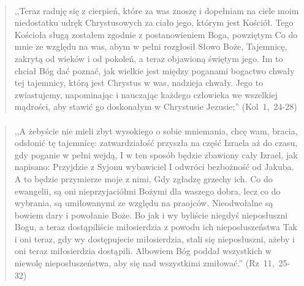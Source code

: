 \documentclass[10pt,a4paper,oneside]{article}
\begin{document}
\paragraph{}
\begin{quote}
,,Teraz raduję się z cierpień, które za was znoszę i dopełniam na ciele moim niedostatku udręk Chrystusowych za ciało jego, którym jest Kościół. Tego Kościoła sługą zostałem zgodnie z postanowieniem Boga, powziętym Co do mnie ze względu na was, abym w pełni rozgłosił Słowo Boże, Tajemnicę, zakrytą od wieków i od pokoleń, a teraz objawioną świętym jego. Im to chciał Bóg dać poznać, jak wielkie jest między poganami bogactwo chwały tej tajemnicy, którą jest Chrystus w was, nadzieja chwały. Jego to zwiastujemy, napominając i nauczając każdego człowieka we wszelkiej mądrości, aby stawić go doskonałym w Chrystusie Jezusie;'' \mbox{(Kol 1, 24-28)}
\end{quote}
\paragraph{}
\begin{quote}
,,A żebyście nie mieli zbyt wysokiego o sobie mniemania, chcę wam, bracia, odsłonić tę tajemnicę: zatwardziałość przyszła na część Izraela aż do czasu, gdy poganie w pełni wejdą, I w ten sposób będzie zbawiony cały Izrael, jak napisano: Przyjdzie z Syjonu wybawiciel I odwróci bezbożność od Jakuba. A to będzie przymierze moje z nimi, Gdy zgładzę grzechy ich. Co do ewangelii, są oni nieprzyjaciółmi Bożymi dla waszego dobra, lecz co do wybrania, są umiłowanymi ze względu na praojców. Nieodwołalne są bowiem dary i powołanie Boże. Bo jak i wy byliście niegdyś nieposłuszni Bogu, a teraz dostąpiliście miłosierdzia z powodu ich nieposłuszeństwa Tak i oni teraz, gdy wy dostępujecie miłosierdzia, stali się nieposłuszni, ażeby i oni teraz miłosierdzia dostąpili. Albowiem Bóg poddał wszystkich w niewolę nieposłuszeństwa, aby się nad wszystkimi zmiłować.'' \mbox{(Rz 11, 25-32)}
\end{quote}
\end{document}
